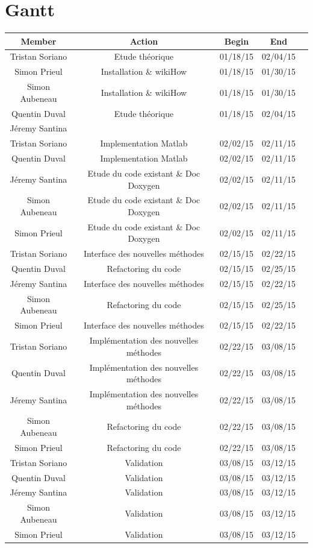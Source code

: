 \documentclass[12pt]{article} %
\begin{document}
\section{Gantt} 
\begin{tabular}{|c|c|c|c|c|}
\hline \textbf{Member} & \textbf{Action} & \textbf{Begin} & \textbf{End} \\ 
\hline Tristan Soriano  & Etude théorique & 01/18/15 & 02/04/15  \\ 
\hline Simon Prieul & Installation \& wikiHow & 01/18/15 & 01/30/15 \\
\hline Simon Aubeneau  & Installation \& wikiHow & 01/18/15 & 01/30/15 \\
\hline Quentin Duval  & Etude théorique & 01/18/15 & 02/04/15 \\
\hline Jéremy Santina  & & & \\

\hline Tristan Soriano & Implementation Matlab & 02/02/15 & 02/11/15 \\
\hline Quentin Duval & Implementation Matlab & 02/02/15 & 02/11/15 \\
\hline Jéremy Santina & Etude du code existant \& Doc Doxygen & 02/02/15 & 02/11/15 \\
\hline Simon Aubeneau & Etude du code existant \& Doc Doxygen & 02/02/15 & 02/11/15 \\
\hline Simon Prieul & Etude du code existant \& Doc Doxygen & 02/02/15 & 02/11/15 \\
\hline Tristan Soriano & Interface des nouvelles méthodes & 02/15/15 & 02/22/15 \\
\hline Quentin Duval & Refactoring du code & 02/15/15 & 02/25/15 \\
\hline Jéremy Santina & Interface des nouvelles méthodes & 02/15/15 & 02/22/15 \\
\hline Simon Aubeneau & Refactoring du code & 02/15/15 & 02/25/15 \\
\hline Simon Prieul & Interface des nouvelles méthodes & 02/15/15 & 02/22/15 \\
\hline Tristan Soriano & Implémentation des nouvelles méthodes & 02/22/15 & 03/08/15 \\
\hline Quentin Duval & Implémentation des nouvelles méthodes & 02/22/15 & 03/08/15 \\
\hline Jéremy Santina & Implémentation des nouvelles méthodes & 02/22/15 & 03/08/15\\
\hline Simon Aubeneau & Refactoring du code & 02/22/15 & 03/08/15 \\
\hline Simon Prieul & Refactoring du code & 02/22/15 & 03/08/15 \\
\hline Tristan Soriano & Validation & 03/08/15 & 03/12/15 \\
\hline Quentin Duval & Validation & 03/08/15 & 03/12/15 \\
\hline Jéremy Santina & Validation & 03/08/15 & 03/12/15 \\
\hline Simon Aubeneau & Validation & 03/08/15 & 03/12/15 \\
\hline Simon Prieul & Validation & 03/08/15 & 03/12/15 \\
\hline 
 
\end{tabular}  
\end{document}
